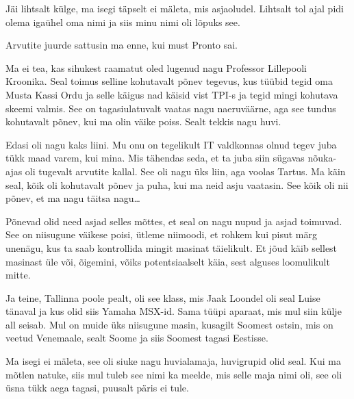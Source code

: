                  

Jäi lihtsalt külge, ma isegi täpselt ei mäleta, mis asjaoludel. Lihtsalt tol 
ajal pidi olema igaühel oma nimi ja siis minu nimi oli lõpuks see.


Arvutite juurde sattusin ma enne, kui must Pronto sai.

Ma ei tea, kas sihukest raamatut oled lugenud nagu Professor Lillepooli 
Kroonika. 
Seal toimus selline kohutavalt põnev tegevus, kus tüübid tegid oma Musta Kassi 
Ordu ja selle käigus nad käisid vist TPI-s ja tegid mingi kohutava skeemi 
valmis. See on  tagasiulatuvalt vaatas nagu naeruväärne, aga see tundus 
kohutavalt  põnev, kui ma  olin väike poiss. Sealt tekkis nagu huvi. 

Edasi oli nagu kaks liini. Mu onu on tegelikult IT valdkonnas olnud tegev juba 
tükk maad varem, kui mina. Mis tähendas seda, et ta juba siin sügavas 
nõuka-ajas oli tugevalt arvutite kallal. See oli nagu üks liin, aga voolas 
Tartus. Ma käin seal, kõik oli kohutavalt põnev ja puha, kui ma neid asju 
vaatasin. See kõik oli nii põnev, et ma nagu täitsa nagu\ldots


Põnevad olid need asjad selles mõttes, et seal on nagu nupud ja asjad toimuvad. 
See on niisugune väikese poisi, ütleme niimoodi, et rohkem kui pisut märg 
unenägu, kus ta saab kontrollida mingit masinat täielikult. Et jõud käib 
sellest masinast üle või, õigemini, võiks potentsiaalselt käia, sest alguses 
loomulikult mitte. 

Ja teine, Tallinna poole pealt, oli see klass, mis Jaak 
Loondel oli seal Luise tänaval ja kus olid siis Yamaha 
MSX-id. Sama tüüpi aparaat, mis mul siin külje all 
seisab. Mul on muide üks niisugune masin, kusagilt Soomest ostsin, mis on 
veetud Venemaale, sealt Soome ja siis Soomest tagasi Eestisse.


Ma isegi ei mäleta, see oli siuke  nagu huvialamaja, huvigrupid olid seal. Kui 
ma mõtlen natuke, siis mul tuleb see nimi ka meelde, mis selle maja nimi oli, 
see oli üsna tükk aega tagasi, puusalt päris ei tule.
                 
